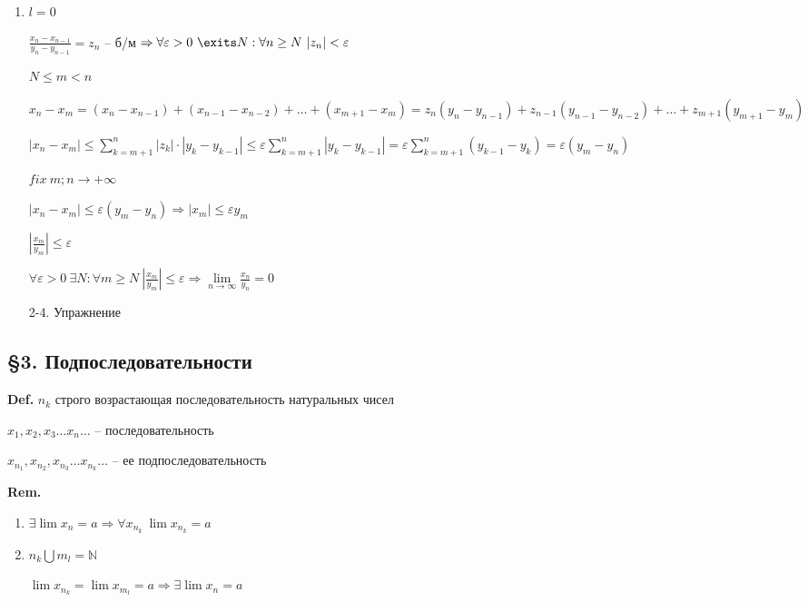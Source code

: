 \documentclass[14pt, letter paper]{article}
\begin{document}
\begin{enumerate}
    \item $l = 0$

    $\frac{x_n-x_{n-1}}{y_n-y_{n-1}} = z_n$ -- б/м $\Rightarrow \forall \varepsilon > 0\ \exits N : \forall n \geq N\ |z_n| < \varepsilon$

    $N \leq m < n$

    $x_n - x_m = (x_n-x_{n-1}) + (x_{n-1} - x_{n-2}) + \ldots + (x_{m+1} - x_m) = z_n(y_n - y_{n-1}) + z_{n-1}(y_{n-1}-y_{n-2}) + \ldots + z_{m+1}(y_{m+1} - y_m)$

    $|x_n - x_m| \leq \sum\limits_{k=m+1}^n |z_k| \cdot |y_k - y_{k-1}| \leq \varepsilon \sum\limits_{k=m+1}^n |y_k - y_{k-1}| = \varepsilon \sum\limits_{k=m+1}^n(y_{k-1} - y_k) = \varepsilon(y_m - y_n)$

    $fix\ m; n \rightarrow + \infty$

    $|x_n - x_m| \leq \varepsilon (y_m - y_n) \Rightarrow |x_m| \leq \varepsilon y_m$

    $|\frac{x_m}{y_m}| \leq \varepsilon$

    $\forall \varepsilon > 0\ \exists N : \forall m \geq N\ |\frac{x_m}{y_m}| \leq \varepsilon \Rightarrow \lim\limits_{n \rightarrow \infty}{\frac{x_n}{y_n}} = 0$

    \item[2-4.] Упражнение
\end{enumerate}

\begin{center}
    \subsection*{\S 3. Подпоследовательности}
\end{center}

\textbf{Def.} $n_k$ строго возрастающая последовательность натуральных чисел

$x_1, x_2, x_3 \ldots x_n \ldots$ -- последовательность

$x_{n_1}, x_{n_2}, x_{n_3} \ldots x_{n_k} \ldots$ -- ее подпоследовательность

\textbf{Rem.}

\begin{enumerate}
    \item $\exists \lim{x_n} = a \Rightarrow \forall x_{n_k}\ \lim{x_{n_k}} = a$
    \item $n_k \bigcup m_l = \mathds{N}$

    $\lim{x_{n_k}} = \lim{x_{m_l}} = a \Rightarrow \exists \lim{x_n} = a$
\end{enumerate}
\end{document}
